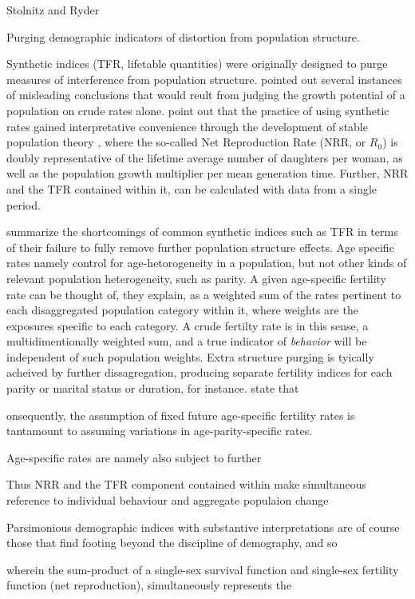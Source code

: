 Stolnitz and Ryder

Purging demographic indicators of distortion from population structure.

Synthetic indices (TFR, lifetable quantities) were originally designed to purge
measures of interference from population structure.
\citet{kuczynski1932fertility, kuczynski1935measurement} pointed out several
instances of misleading conclusions that would reult from judging the growth
potential of a population on crude rates alone. \citep{stolnitz1949recent}
point out that the practice of using synthetic rates gained interpretative
convenience through the development of stable population theory
\citep{sharpe1911problem, lotka1922stability}, where the so-called Net
Reproduction Rate (NRR, or $R_0$) is doubly representative of the lifetime
average number of daughters per woman, as well as the population growth
multiplier per mean generation time. Further, NRR and the TFR contained within
it, can be calculated with data from a single period.

\citet{stolnitz1949recent} summarize the shortcomings of common synthetic
indices such as TFR in terms of their failure to fully remove further population structure effects. Age
specific rates namely control for age-hetorogeneity in a population, but not
other kinds of relevant population heterogeneity, such as parity. A given
age-specific fertility rate can be thought of, they explain, as a weighted sum
of the rates pertinent to each disaggregated population category within it,
where weights are the exposures specific to each category. A crude fertilty rate
is in this sense, a multidimentionally weighted sum, and a true indicator of
\textit{behavior} will be independent of such population weights. Extra
structure purging is tyically acheived by further dissagregation, producing
separate fertility indices for each parity or marital status or duration, for
instance. \citet[p. 120]{stolnitz1949recent} state that

\begin{citation}
[c]onsequently, the assumption of fixed future age-specific fertility rates is
tantamount to assuming variations in age-parity-specific rates.
\end{citation}






 Age-specific rates are namely also subject to further

Thus NRR and the TFR component contained
within make simultaneous reference to individual behaviour and aggregate
populaion change

Parsimonious demographic indices with
substantive interpretations are of course those that find footing beyond the
discipline of demography, and so 


 wherein the sum-product of a single-sex survival function and single-sex fertility function (net reproduction), simultaneously represents the